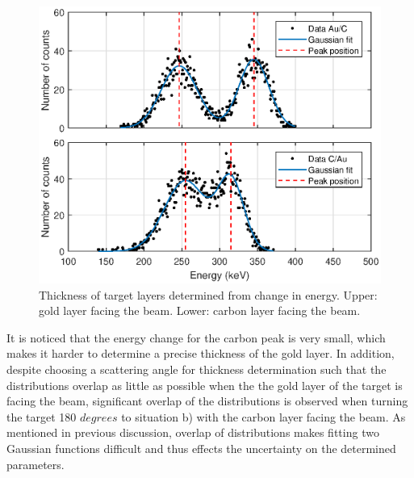 


\begin{figure}[t]
\centering
\includegraphics[width=0.99\columnwidth]{Dterminethicknessplot.eps}
\caption{Thickness of target layers determined from change in energy. Upper: gold layer facing the beam. Lower: carbon layer facing the beam.}
\label{fig_thickness}
\end{figure}

It is noticed that the energy change for the carbon peak is very small, which makes it harder to determine a precise thickness of the gold layer.
In addition, despite choosing a scattering angle for thickness determination such that the distributions overlap as little as possible when the the gold layer of the target is facing the beam, significant overlap of the distributions is observed when turning the target 180 $\si{degrees}$ to situation b) with the carbon layer facing the beam. As mentioned in previous discussion, overlap of distributions makes fitting two Gaussian functions difficult and thus effects the uncertainty on the determined parameters.








